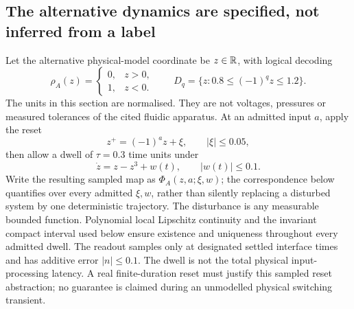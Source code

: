 \subsection{The alternative dynamics are specified, not inferred from a label}
Let the alternative physical-model coordinate be $z\in\mathbb{R}$, with logical decoding
\[
 \rho_A(z)=\begin{cases}0,&z>0,\\1,&z<0.\end{cases}
 \qquad
 D_q=\{z:0.8\leq(-1)^qz\leq1.2\}.
\]
The units in this section are normalised. They are not voltages, pressures or measured tolerances of the cited fluidic apparatus. At an admitted input $a$, apply the reset
\begin{equation}\label{eq:reset}
 z^+=(-1)^a z+\xi,\qquad |\xi|\leq0.05,
\end{equation}
then allow a dwell of $\tau=0.3$ time units under
\begin{equation}\label{eq:bistable}
 \dot z=z-z^3+w(t),\qquad |w(t)|\leq0.1.
\end{equation}
Write the resulting sampled map as $\Phi_A(z,a;\xi,w)$; the correspondence below quantifies over every admitted $\xi,w$, rather than silently replacing a disturbed system by one deterministic trajectory. The disturbance is any measurable bounded function. Polynomial local Lipschitz continuity and the invariant compact interval used below ensure existence and uniqueness throughout every admitted dwell. The readout samples only at designated settled interface times and has additive error $|n|\leq0.1$. The dwell is not the total physical input-processing latency. A real finite-duration reset must justify this sampled reset abstraction; no guarantee is claimed during an unmodelled physical switching transient.

